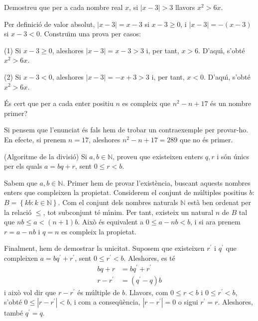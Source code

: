 \begin{exercici}
Demostreu que per a cada nombre real $x$, si $\left\vert x-3\right\vert >3$
llavors $x^{2}>6x$.
\end{exercici}

\begin{solucio}
Per definici\'{o} de valor absolut, $\left\vert x-3\right\vert =x-3$ si
$x-3\geq0$, i $\left\vert x-3\right\vert =-\left(  x-3\right)  $ si $x-3<0$.
Constru\"{\i}m una prova per casos:

(1) Si $x-3\geq0$, aleshores $\left\vert x-3\right\vert =x-3>3$ i, per tant,
$x>6$. D'aqu\'{\i}, s'obt\'{e} $x^{2}>6x$.

(2) Si $x-3<0$, aleshores $\left\vert x-3\right\vert =-x+3>3$ i, per tant,
$x<0$. D'aqu\'{\i}, s'obt\'{e} $x^{2}>6x$.
\end{solucio}

\begin{exercici}
\'{E}s cert que per a cada enter positiu $n$ es compleix que $n^{2}-n+17$
\'{e}s un nombre primer?
\end{exercici}

\begin{solucio}
Si pensem que l'enunciat \'{e}s fals hem de trobar un contraexemple per
provar-ho. En efecte, si prenem $n=17$, aleshores $n^{2}-n+17=289$ que no
\'{e}s primer.
\end{solucio}

\begin{exercici}
(Algoritme de la divisi\'{o}) Si $a,b\in\mathbb{N}$, proveu que existeixen
enters $q,r$ i s\'{o}n \'{u}nics per els quals $a=bq+r$, sent $0\leq r<b$.
\end{exercici}

\begin{solucio}
Sabem que $a,b\in\mathbb{N}$. Primer hem de provar l'exist\`{e}ncia, buscant
aquests nombres enters que compleixen la propietat. Considerem el conjunt de
m\'{u}ltiples positius $b$: $B=\left\{  kb:k\in\mathbb{N}\right\}  $. Com el
conjunt dels nombres naturals $\mathbb{N}$ est\`{a} ben ordenat per la
relaci\'{o} $\leq$, tot subconjunt t\'{e} m\'{\i}nim. Per tant, existeix un
natural $n$ de $B$ tal que $nb\leq a<(n+1)b$. Aix\`{o} \'{e}s equivalent a
$0\leq a-nb<b$, i si ara prenem $r=a-nb$ i $q=n$ es compleix la propietat.

Finalment, hem de demostrar la unicitat. Suposem que existeixen $r^{\prime}$ i
$q^{\prime}$ que compleixen $a=bq^{\prime}+r^{\prime}$, sent $0\leq r^{\prime
}<b$. Aleshores, es t\'{e}%
\begin{align*}
bq+r  &  =bq^{\prime}+r^{\prime}\\
r-r^{\prime}  &  =(q^{\prime}-q)b
\end{align*}
i aix\`{o} vol dir que $r-r^{\prime}$ \'{e}s m\'{u}ltiple de $b$. Llavors, com
$0\leq r<b$ i $0\leq r^{\prime}<b$, s'obt\'{e} $0\leq\left\vert r-r^{\prime
}\right\vert <b$, i com a conseq\"{u}\`{e}ncia, $\left\vert r-r^{\prime
}\right\vert =0$ o sigui $r^{\prime}=r$. Aleshores, tamb\'{e} $q^{\prime}=q$.
\end{solucio}

